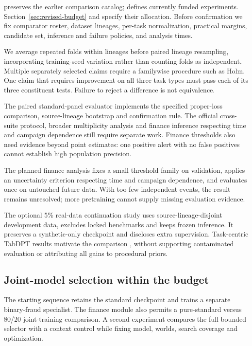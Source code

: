 \documentclass[11pt]{article}
\begin{document}
 preserves the earlier comparison catalog;  defines currently funded experiments. Section~\ref{sec:revised-budget} and  specify their allocation. Before confirmation we fix comparator roster, dataset lineages, per-task normalization, practical margins, candidate set, inference and failure policies, and analysis times.

We average repeated folds within lineages before paired lineage resampling, incorporating training-seed variation rather than counting folds as independent. Multiple separately selected claims require a familywise procedure such as Holm. One claim that requires improvement on all three task types must pass each of its three constituent tests. Failure to reject a difference is not equivalence.

The paired standard-panel evaluator implements the specified proper-loss comparison, source-lineage bootstrap and confirmation rule. The official cross-suite protocol, broader multiplicity analysis and finance inference respecting time and campaign dependence still require separate work. Finance thresholds also need evidence beyond point estimates: one positive alert with no false positives cannot establish high population precision.

The planned finance analysis fixes a small threshold family on validation, applies an uncertainty criterion respecting time and campaign dependence, and evaluates once on untouched future data. With too few independent events, the result remains unresolved; more pretraining cannot supply missing evaluation evidence.

The optional 5\% real-data continuation study uses source-lineage-disjoint development data, excludes locked benchmarks and keeps frozen inference. It preserves a synthetic-only checkpoint and discloses extra supervision. Task-centric TabDPT results motivate the comparison \cite{tabdpt,taskcentric}, without supporting contaminated evaluation or attributing all gains to procedural priors.

\subsection{Joint-model selection within the budget}

The starting sequence retains the standard checkpoint and trains a separate binary-fraud specialist. The finance module also permits a pure-standard versus 80/20 joint-training comparison. A second experiment compares the full bounded selector with a context control while fixing model, worlds, search coverage and optimization.
\end{document}
